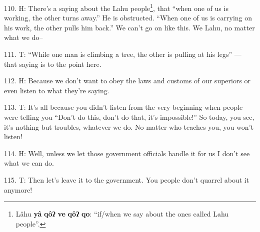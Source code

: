 110. H: There's a saying about the Lahu people\footnote{Lâhu \textbf{yâ} \textbf{qôʔ} \textbf{ve} \textbf{qôʔ} \textbf{qo}: ``if/when we say about the ones called Lahu people''.}, that ``when one of us
is working, the other turns away.'' He is obstructed. ``When one of us is carrying
on his work, the other pulls him back.'' We can't go on like this. We Lahu, no
matter what we do--

111. T: ``While one man is climbing a tree, the other is pulling at his legs''
--- that saying is to the point here.

112. H: Because we don't want to obey the laws and customs of our superiors or even
listen to what they're saying.

113. T: It's all because you didn't listen from the very beginning when people
were telling you ``Don't do this, don't do that, it's impossible!''
So today, you see, it's nothing but troubles, whatever we do. No matter who teaches
you, you won't listen!

114. H: Well, unless we let those government officials handle it for us I don't
see what we can do.

115. T: Then let's leave it to the government. You people don't quarrel about
it anymore!

